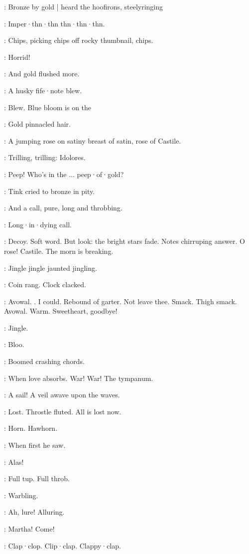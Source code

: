 :
Bronze by gold |
heard the hoofirons,
steelyringing

\boots:
Imper·thn·thn thn·thn·thn.

\simon:
Chips,
picking chips off rocky thumbnail,
chips.

\MissK:
Horrid!

:
And gold flushed more.

:
A husky fife·note blew.

\Bloom:
Blew.
Blue bloom is on the

:
Gold pinnacled hair.

\Bloom:
A jumping rose on satiny breast of satin,
rose of Castile.

\MissD:
Trilling, trilling:
Idolores.

\lenehan:
Peep!
Who's in the ...
peep·of·gold?

:
Tink cried to bronze in pity.

:
And a call,
pure,
long and throbbing.

\Bloom:
Long·in·dying call.

\Bloom:
Decoy.
Soft word.
But look:
the bright stars fade.
Notes chirruping answer.
O rose!
Castile.
The morn is breaking.

\boylan:
Jingle jingle jaunted jingling.

\Bloom:
Coin rang.
Clock clacked.

\lenehan:
Avowal.
.
I could.
Rebound of garter.
Not leave thee.
Smack.
Thigh smack.
Avowal.
Warm.
Sweetheart, goodbye!

\boylan:
Jingle.

\Bloom:
Bloo.

:
Boomed crashing chords.

\Bloom:
When love absorbs.
War!
War!
The tympanum.

\Bloom:
A sail!
A veil awave upon the waves.

\Bloom:
Lost.
Throstle fluted.
All is lost now.

\boylan:
Horn.
Hawhorn.

:
When first he saw.

\Bloom:
Alas!

\Bloom:
Full tup.
Full throb.

:
Warbling.

\Bloom:
Ah, lure!
Alluring.

\Bloom:
Martha!
Come!

:
Clap·clop.
Clip·clap.
Clappy·clap.

